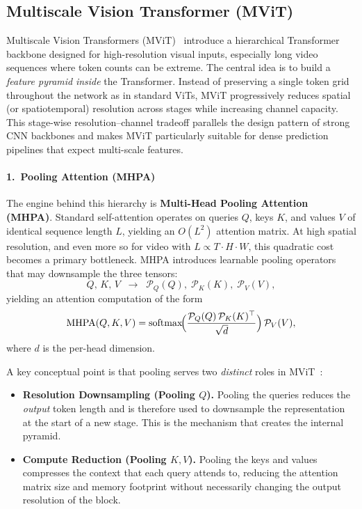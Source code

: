 \newpage

\subsection{Multiscale Vision Transformer (MViT)}
\label{sec:mvit_overview}

\noindent
Multiscale Vision Transformers (MViT)~\cite{fan2021_mvit} introduce a hierarchical Transformer backbone designed for high-resolution visual inputs, especially long video sequences where token counts can be extreme.
The central idea is to build a \emph{feature pyramid} \emph{inside} the Transformer.
Instead of preserving a single token grid throughout the network as in standard ViTs, MViT progressively reduces spatial (or spatiotemporal) resolution across stages while increasing channel capacity.
This stage-wise resolution--channel tradeoff parallels the design pattern of strong CNN backbones and makes MViT particularly suitable for dense prediction pipelines that expect multi-scale features.

\paragraph{1.\ Pooling Attention (MHPA)}
\noindent
The engine behind this hierarchy is \textbf{Multi-Head Pooling Attention (MHPA)}.
Standard self-attention operates on queries \(Q\), keys \(K\), and values \(V\) of identical sequence length \(L\), yielding an \(O(L^2)\) attention matrix.
At high spatial resolution, and even more so for video with \(L \propto T \cdot H \cdot W\), this quadratic cost becomes a primary bottleneck.
MHPA introduces learnable pooling operators that may downsample the three tensors:
\[
Q,\, K,\, V
\;\;\longrightarrow\;\;
\mathcal{P}_Q(Q),\;
\mathcal{P}_K(K),\;
\mathcal{P}_V(V),
\]
yielding an attention computation of the form
\[
\operatorname{MHPA}(Q,K,V)
=
\operatorname{softmax}\!\Bigl(
\frac{
	\mathcal{P}_Q(Q)\,\mathcal{P}_K(K)^\top
}{
	\sqrt{d}
}
\Bigr)\,
\mathcal{P}_V(V),
\]
where \(d\) is the per-head dimension.

\noindent
A key conceptual point is that pooling serves two \emph{distinct} roles in MViT~\cite{fan2021_mvit}:
\begin{itemize}
	\item \textbf{Resolution Downsampling (Pooling \(Q\)).} Pooling the queries reduces the \emph{output} token length and is therefore used to downsample the representation at the start of a new stage. This is the mechanism that creates the internal pyramid. 
	\item \textbf{Compute Reduction (Pooling \(K,V\)).} Pooling the keys and values compresses the context that each query attends to, reducing the attention matrix size and memory footprint without necessarily changing the output resolution of the block.
\end{itemize}

